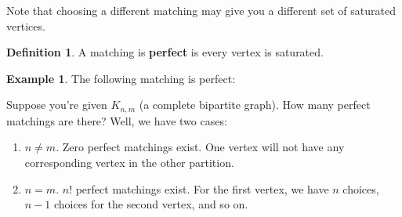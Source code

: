 \documentclass[]{article}
\theoremstyle{definition}
\newtheorem*{defn}{Definition}
\newtheorem{ex}{Example}[section]
\begin{document}
				Note that choosing a different matching may give you a different set of saturated vertices.
				
				\begin{defn}
					A matching is \textbf{perfect} is every vertex is saturated.
				\end{defn}
				
				\begin{ex}
					The following matching is perfect:
					\begin{center}
					\end{center}
				\end{ex}
				
				Suppose you're given $K_{n,m}$ (a complete bipartite graph). How many perfect matchings are there? Well, we have two cases:
				\begin{enumerate}
					\item $n \ne m$. Zero perfect matchings exist. One vertex will not have any corresponding vertex in the other partition.
					\item $n = m$. $n!$ perfect matchings exist. For the first vertex, we have $n$ choices, $n-1$ choices for the second vertex, and so on.
				\end{enumerate}
				
\end{document}
